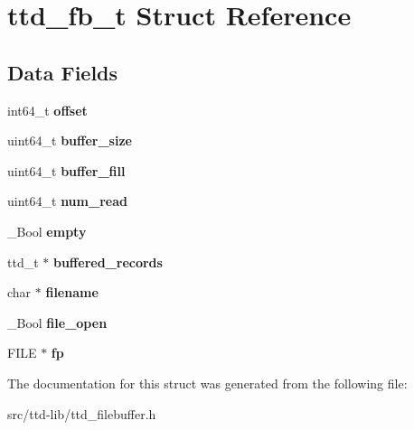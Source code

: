 \hypertarget{structttd__fb__t}{}\section{ttd\+\_\+fb\+\_\+t Struct Reference}
\label{structttd__fb__t}
\subsection*{Data Fields}
\begin{DoxyCompactItemize}
\item 
\hypertarget{structttd__fb__t_af0c9ee86a72d3c03c9214e7129895fca}{}int64\+\_\+t {\bfseries offset}\label{structttd__fb__t_af0c9ee86a72d3c03c9214e7129895fca}

\item 
\hypertarget{structttd__fb__t_a79324b50653f8fe099da43b5dcc0a736}{}uint64\+\_\+t {\bfseries buffer\+\_\+size}\label{structttd__fb__t_a79324b50653f8fe099da43b5dcc0a736}

\item 
\hypertarget{structttd__fb__t_aba6d4afce544bffde3b3f6b64bb5d06e}{}uint64\+\_\+t {\bfseries buffer\+\_\+fill}\label{structttd__fb__t_aba6d4afce544bffde3b3f6b64bb5d06e}

\item 
\hypertarget{structttd__fb__t_a8a64fe5aaada1aaefe6c3a7da6138d55}{}uint64\+\_\+t {\bfseries num\+\_\+read}\label{structttd__fb__t_a8a64fe5aaada1aaefe6c3a7da6138d55}

\item 
\hypertarget{structttd__fb__t_a92bffd35b453054e62d8fc2cf9378480}{}\+\_\+\+Bool {\bfseries empty}\label{structttd__fb__t_a92bffd35b453054e62d8fc2cf9378480}

\item 
\hypertarget{structttd__fb__t_a1761da2b50bdca2e2be9387fd55e9576}{}ttd\+\_\+t $\ast$ {\bfseries buffered\+\_\+records}\label{structttd__fb__t_a1761da2b50bdca2e2be9387fd55e9576}

\item 
\hypertarget{structttd__fb__t_ad7c2ed7eb26cb8710696bae3b0c865ff}{}char $\ast$ {\bfseries filename}\label{structttd__fb__t_ad7c2ed7eb26cb8710696bae3b0c865ff}

\item 
\hypertarget{structttd__fb__t_a21f218e7edb91253d0029e9fa5e0e517}{}\+\_\+\+Bool {\bfseries file\+\_\+open}\label{structttd__fb__t_a21f218e7edb91253d0029e9fa5e0e517}

\item 
\hypertarget{structttd__fb__t_a78c0509bb511a806ce221221a40d43d2}{}F\+I\+L\+E $\ast$ {\bfseries fp}\label{structttd__fb__t_a78c0509bb511a806ce221221a40d43d2}

\end{DoxyCompactItemize}


The documentation for this struct was generated from the following file\+:\begin{DoxyCompactItemize}
\item 
src/ttd-\/lib/ttd\+\_\+filebuffer.\+h\end{DoxyCompactItemize}
